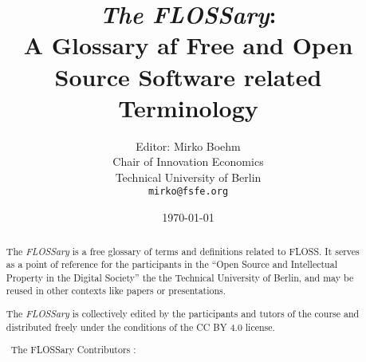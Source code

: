 \documentclass[a4paper]{article}
\title{{\em The FLOSSary}:\\
  A Glossary af Free and Open Source Software related Terminology}
\author{Editor: Mirko Boehm\\
  Chair of Innovation Economics\\
  Technical University of Berlin\\
  \texttt{mirko@fsfe.org}}
\date{\today}
\begin{document}
\newcommand{\flossary}{{\em FLOSSary} }

\maketitle \thispagestyle{empty}
\begin{abstract}
  \noindent
  The \flossary is a free glossary of terms and definitions related to
  \gls{FLOSS}. It serves as a point of reference for the participants
  in the ``Open Source and Intellectual Property in the Digital
  Society'' the the Technical University of Berlin, and may be reused
  in other contexts like papers or presentations.

  The \flossary is
  collectively edited by the participants and tutors of the course and
  distributed freely under the conditions of the CC BY 4.0 license.

  \vspace{0.5cm}
  \noindent \textcopyright~The FLOSSary Contributors \ccby: \\ 
\end{abstract}

\clearpage
\glsaddall
\printnoidxglossary[nonumberlist]
\clearpage
\printnoidxglossary[type=\acronymtype,nonumberlist]
\clearpage

\end{document}
